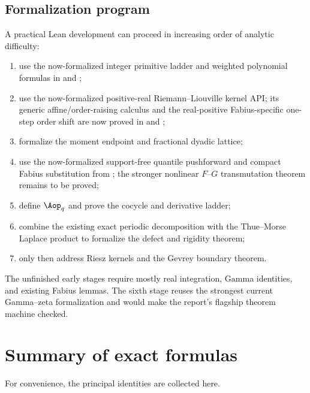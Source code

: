 \documentclass[11pt,oneside]{article}
\theoremstyle{definition}
\theoremstyle{remark}
\newcommand{\1}{\mathbf 1}
\begin{document}
\subsection{Formalization program}

A practical Lean development can proceed in increasing order of analytic difficulty:
\begin{enumerate}
\item[\(\checkmark\)] use the now-formalized integer primitive ladder and weighted polynomial
       formulas in  and ;
\item[\(\checkmark\)] use the now-formalized positive-real Riemann--Liouville kernel API;
      its generic affine/order-raising calculus and the real-positive Fabius-specific
      one-step order shift are now proved in  and
      ;
\item formalize the moment endpoint and fractional dyadic lattice;
\item[\(\checkmark\)] use the now-formalized support-free quantile pushforward and compact
      Fabius substitution from ; the stronger nonlinear
      \(F\)--\(G\) transmutation theorem remains to be proved;
\item define $\Aop_q$ and prove the cocycle and derivative ladder;
\item combine the existing exact periodic decomposition with the Thue--Morse Laplace product
      to formalize the defect and rigidity theorem;
\item only then address Riesz kernels and the Gevrey boundary theorem.
\end{enumerate}
The unfinished early stages require mostly real integration, Gamma identities, and existing
Fabius lemmas.  The sixth stage reuses the strongest current Gamma--zeta formalization and would make
the report's flagship theorem machine checked.

\section{Summary of exact formulas}
\label{p7:sec:summary-formulas}

For convenience, the principal identities are collected here.
\end{document}
